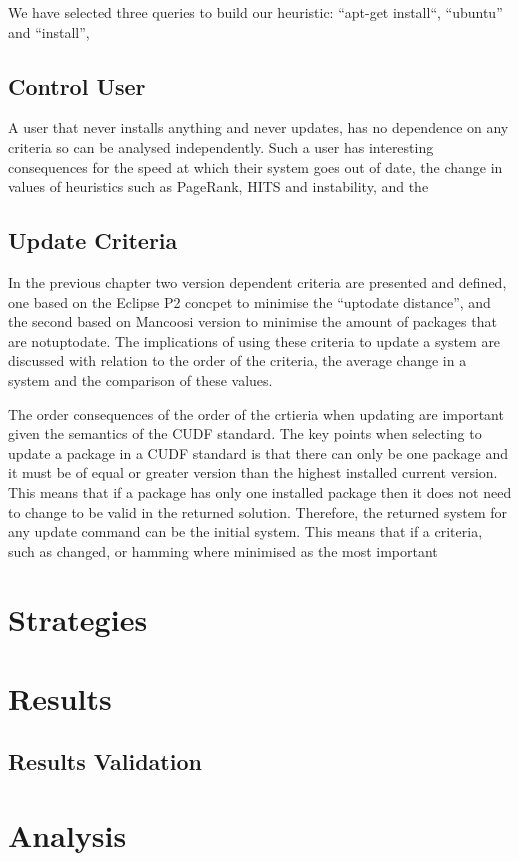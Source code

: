 We have selected three queries to build our heuristic:
``apt-get install``, ``ubuntu'' and ``install'', 



\subsection{Control User}
{}A user that never installs anything and never updates, has no dependence on any criteria so can be analysed independently.
{}Such a user has interesting consequences for the speed at which their system goes out of date, the change in values of heuristics such as PageRank, HITS and instability,
{}and the 

\subsection{Update Criteria}
{}In the previous chapter two version dependent criteria are presented and defined, one based on the Eclipse P2 concpet to minimise the ``uptodate distance'', 
{}and the second based on Mancoosi version to minimise the amount of packages that are notuptodate. 
{}The implications of using these criteria to update a system are discussed with relation to the order of the criteria, the average change in a system and the comparison of these values.

The order consequences of the order of the crtieria when updating are important given the semantics of the CUDF standard.
The key points when selecting to update a package in a CUDF standard is that there can only be one package and it must be of equal or greater version than the highest installed current version.
This means that if a package has only one installed package then it does not need to change to be valid in the returned solution.
Therefore, the returned system for any update command can be the initial system.
This means that if a criteria, such as changed, or hamming where minimised as the most important  


\section{Strategies}

\section{Results}

\subsection{Results Validation}

\section{Analysis}

